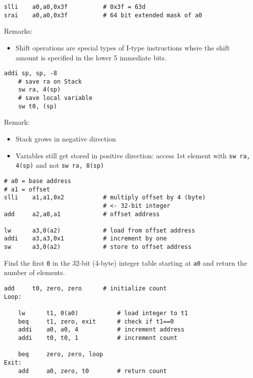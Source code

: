 \newpar{}

\begin{lstlisting}[language={[RISC-V]Assembler}]
slli    a0,a0,0x3f          # 0x3f = 63d
srai    a0,a0,0x3f          # 64 bit extended mask of a0
\end{lstlisting}

Remarks:
\begin{itemize}
    \item Shift operations are special types of I-type instructions where the shift amount is specified in the lower 5 immediate bits.
\end{itemize}

\newpar{}

\begin{lstlisting}[language={[RISC-V]Assembler}]
    addi sp, sp, -8
    # save ra on Stack
    sw ra, 4(sp)
    # save local variable
    sw t0, (sp)
\end{lstlisting}
Remark:
\begin{itemize}
    \item Stack grows in negative direction
    \item Variables still get stored in positive direction: access 1st element with \texttt{sw ra, 4(sp)} and not \texttt{sw ra, 8(sp)}
\end{itemize}

\newpar{}

\begin{lstlisting}[language={[RISC-V]Assembler}]
# a0 = base address
# a1 = offset
slli    a1,a1,0x2           # multiply offset by 4 (byte) 
                            # <- 32-bit integer
add     a2,a0,a1            # offset address

lw      a3,0(a2)            # load from offset address
addi    a3,a3,0x1           # increment by one
sw      a3,0(a2)            # store to offset address
\end{lstlisting}

\newpar{}

Find the first \texttt{0} in the 32-bit (4-byte) integer table starting at \texttt{a0} and return the number of elements.
\begin{lstlisting}[language={[RISC-V]Assembler}]
    add     t0, zero, zero      # initialize count
Loop:

    lw      t1, 0(a0)           # load integer to t1
    beq     t1, zero, exit      # check if t1==0
    addi    a0, a0, 4           # increment address
    addi    t0, t0, 1           # increment count

    beq     zero, zero, loop
Exit:
    add     a0, zero, t0        # return count
\end{lstlisting}


